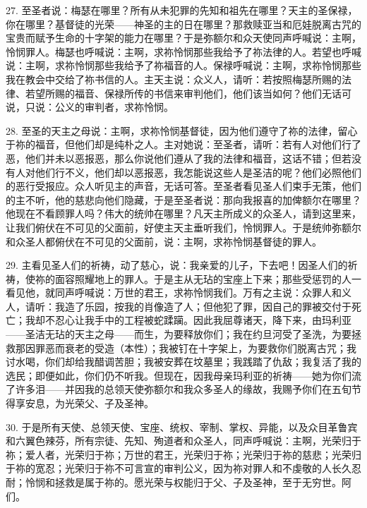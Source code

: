 27. 至圣者说：梅瑟在哪里？所有从未犯罪的先知和祖先在哪里？天主的圣保禄，你在哪里？基督徒的光荣——神圣的主的日在哪里？那救赎亚当和厄娃脱离古咒的宝贵而赋予生命的十字架的能力在哪里？于是弥额尔和众天使同声呼喊说：主啊，怜悯罪人。梅瑟也呼喊说：主啊，求祢怜悯那些我给予了祢法律的人。若望也呼喊说：主啊，求祢怜悯那些我给予了祢福音的人。保禄呼喊说：主啊，求祢怜悯那些我在教会中交给了祢书信的人。主天主说：众义人，请听：若按照梅瑟所赐的法律、若望所赐的福音、保禄所传的书信来审判他们，他们该当如何？他们无话可说，只说：公义的审判者，求祢怜悯。\par

28. 至圣的天主之母说：主啊，求祢怜悯基督徒，因为他们遵守了祢的法律，留心于祢的福音，但他们却是纯朴之人。主对她说：至圣者，请听：若有人对他们行了恶，他们并未以恶报恶，那么你说他们遵从了我的法律和福音，这话不错；但若没有人对他们行不义，他们却以恶报恶，我怎能说这些人是圣洁的呢？他们必照他们的恶行受报应。众人听见主的声音，无话可答。至圣者看见圣人们束手无策，他们的主不听，他的慈悲向他们隐藏，于是至圣者说：那向我报喜的加俾额尔在哪里？他现在不看顾罪人吗？伟大的统帅在哪里？凡天主所成义的众圣人，请到这里来，让我们俯伏在不可见的父面前，好使主天主垂听我们，怜悯罪人。于是统帅弥额尔和众圣人都俯伏在不可见的父面前，说：主啊，求祢怜悯基督徒的罪人。\par

29. 主看见圣人们的祈祷，动了慈心，说：我亲爱的儿子，下去吧！因圣人们的祈祷，使祢的面容照耀地上的罪人。于是主从无玷的宝座上下来；那些受惩罚的人一看见他，就同声呼喊说：万世的君王，求祢怜悯我们。万有之主说：众罪人和义人，请听：我造了乐园，按我的肖像造了人；但他犯了罪，因自己的罪被交付于死亡；我却不忍心让我手中的工程被蛇蹂躏。因此我屈尊诸天，降下来，由玛利亚——圣洁无玷的天主之母——而生，为要释放你们；我在约旦河受了圣洗，为要拯救那因罪恶而衰老的受造（本性）；我被钉在十字架上，为要救你们脱离古咒；我讨水喝，你们却给我醋调苦胆；我被安葬在坟墓里；我践踏了仇敌；我复活了我的选民；即便如此，你们仍不听我。但现在，因我母亲玛利亚的祈祷——她为你们流了许多泪——并因我的总领天使弥额尔和我众多圣人的缘故，我赐予你们在五旬节得享安息，为光荣父、子及圣神。\par

30. 于是所有天使、总领天使、宝座、统权、宰制、掌权、异能，以及众目革鲁宾和六翼色辣芬，所有宗徒、先知、殉道者和众圣人，同声呼喊说：主啊，光荣归于祢；爱人者，光荣归于祢；万世的君王，光荣归于祢；光荣归于祢的慈悲；光荣归于祢的宽忍；光荣归于祢不可言宣的审判公义，因为祢对罪人和不虔敬的人长久忍耐；怜悯和拯救是属于祢的。愿光荣与权能归于父、子及圣神，至于无穷世。阿们。\par

